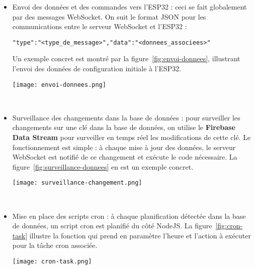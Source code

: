 \begin{itemize}
\item Envoi des données et des commandes vers l'ESP32 : ceci se fait globalement par des messages WebSocket. On suit le format JSON pour les communications entre le serveur WebSocket et l'ESP32 :\begin{alltt}
{ "type": "<type_de_message>", "data": "<donnees_associees>" }
\end{alltt} 
Un exemple concret est montré par la figure~\ref{fig:envoi-donnees}, illustrant l'envoi des données de configuration initiale à l'ESP32.

\begin{minipage}{\linewidth}
  \centering
  \texttt{[image: envoi-donnees.png]}
  \label{fig:envoi-donnees}
\end{minipage}\\


\item Surveillance des changements dans la base de données : pour surveiller les changements sur une clé dans la base de données, on utilise le \textbf{Firebase Data Stream} pour surveiller en temps réel les modifications de cette clé. Le fonctionnement est simple : à chaque mise à jour des données, le serveur WebSocket est notifié de ce changement et exécute le code nécessaire. La figure~\ref{fig:surveillance-donnees} en est un exemple concret.

\begin{minipage}{\linewidth}
  \centering
  \texttt{[image: surveillance-changement.png]}
  \label{fig:surveillance-donnees}
\end{minipage}\\

\item Mise en place des scripts cron : à chaque planification détectée dans la base de données, un script cron est planifié du côté NodeJS. La figure~\ref{fig:cron-task} illustre la fonction qui prend en paramètre l'heure et l'action à exécuter pour la tâche cron associée.

\begin{minipage}{\linewidth}
  \centering
  \texttt{[image: cron-task.png]}
  \label{fig:cron-task}
\end{minipage}

\end{itemize}


